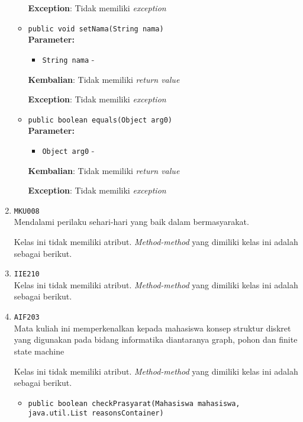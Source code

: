 \documentclass{article}
\begin{document}
\begin{enumerate}
\begin{itemize}
\textbf{Exception}: Tidak memiliki \textit{exception}

\item \texttt{public void setNama(String nama)}\\ 


\textbf{Parameter:}\begin{itemize}
\item \texttt{String nama} - 
\end{itemize}
\textbf{Kembalian}: Tidak memiliki \textit{return value}

\textbf{Exception}: Tidak memiliki \textit{exception}

\item \texttt{public boolean equals(Object arg0)}\\ 


\textbf{Parameter:}\begin{itemize}
\item \texttt{Object arg0} - 
\end{itemize}
\textbf{Kembalian}: Tidak memiliki \textit{return value}

\textbf{Exception}: Tidak memiliki \textit{exception}

\end{itemize}
\item \texttt{MKU008}\\ 
Mendalami perilaku sehari-hari yang baik dalam bermasyarakat.

Kelas ini tidak memiliki atribut. \textit{Method-method} yang dimiliki kelas ini adalah sebagai berikut.
\begin{itemize}
\end{itemize}
\item \texttt{IIE210}\\ 
Kelas ini tidak memiliki atribut. \textit{Method-method} yang dimiliki kelas ini adalah sebagai berikut.
\begin{itemize}
\end{itemize}
\item \texttt{AIF203}\\ 
Mata kuliah ini memperkenalkan kepada mahasiswa konsep struktur diskret yang 
 digunakan pada bidang informatika diantaranya graph, pohon dan finite state 
 machine

Kelas ini tidak memiliki atribut. \textit{Method-method} yang dimiliki kelas ini adalah sebagai berikut.
\begin{itemize}
\item \texttt{public boolean checkPrasyarat(Mahasiswa mahasiswa, java.util.List reasonsContainer)}\\ 



\end{itemize}
\end{enumerate}
\end{document}

